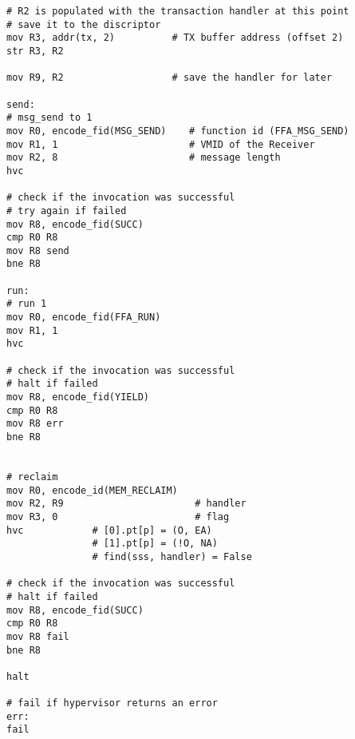\documentclass{article}
\begin{document}
\begin{lstlisting}[caption={VM 0}]
# R2 is populated with the transaction handler at this point
# save it to the discriptor
mov R3, addr(tx, 2)          # TX buffer address (offset 2)
str R3, R2

mov R9, R2                   # save the handler for later

send:
# msg_send to 1
mov R0, encode_fid(MSG_SEND)    # function id (FFA_MSG_SEND)
mov R1, 1                       # VMID of the Receiver
mov R2, 8                       # message length
hvc

# check if the invocation was successful
# try again if failed
mov R8, encode_fid(SUCC)
cmp R0 R8
mov R8 send
bne R8

run:
# run 1
mov R0, encode_fid(FFA_RUN)
mov R1, 1
hvc

# check if the invocation was successful
# halt if failed
mov R8, encode_fid(YIELD)
cmp R0 R8
mov R8 err
bne R8


# reclaim
mov R0, encode_id(MEM_RECLAIM)
mov R2, R9                       # handler
mov R3, 0                        # flag
hvc            # [0].pt[p] = (O, EA)
               # [1].pt[p] = (!O, NA)
               # find(sss, handler) = False

# check if the invocation was successful
# halt if failed
mov R8, encode_fid(SUCC)
cmp R0 R8
mov R8 fail
bne R8

halt

# fail if hypervisor returns an error
err:
fail

\end{lstlisting}
\end{document}
